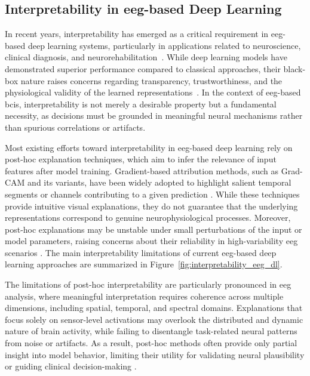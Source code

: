 \subsection{Interpretability in \gls{eeg}-based Deep Learning}

In recent years, interpretability has emerged as a critical requirement in \gls{eeg}-based deep learning systems, particularly in applications related to neuroscience, clinical diagnosis, and neurorehabilitation~\cite{shoka2019literature}. While deep learning models have demonstrated superior performance compared to classical approaches, their black-box nature raises concerns regarding transparency, trustworthiness, and the physiological validity of the learned representations~\cite{bouazizi2024interpretability}. In the context of \gls{eeg}-based \glspl{bci}, interpretability is not merely a desirable property but a fundamental necessity, as decisions must be grounded in meaningful neural mechanisms rather than spurious correlations or artifacts.

Most existing efforts toward interpretability in \gls{eeg}-based deep learning rely on post-hoc explanation techniques, which aim to infer the relevance of input features after model training. Gradient-based attribution methods, such as Grad-CAM and its variants, have been widely adopted to highlight salient temporal segments or channels contributing to a given prediction \cite{samek2019explainable}. While these techniques provide intuitive visual explanations, they do not guarantee that the underlying representations correspond to genuine neurophysiological processes. Moreover, post-hoc explanations may be unstable under small perturbations of the input or model parameters, raising concerns about their reliability in high-variability \gls{eeg} scenarios \cite{bouazizi2024interpretability}. {The main interpretability limitations of current \gls{eeg}-based deep learning approaches are summarized in Figure~\ref{fig:interpretability_eeg_dl}.}

The limitations of post-hoc interpretability are particularly pronounced in \gls{eeg} analysis, where meaningful interpretation requires coherence across multiple dimensions, including spatial, temporal, and spectral domains. Explanations that focus solely on sensor-level activations may overlook the distributed and dynamic nature of brain activity, while failing to disentangle task-related neural patterns from noise or artifacts. As a result, post-hoc methods often provide only partial insight into model behavior, limiting their utility for validating neural plausibility or guiding clinical decision-making \cite{wang2019eeg}.

